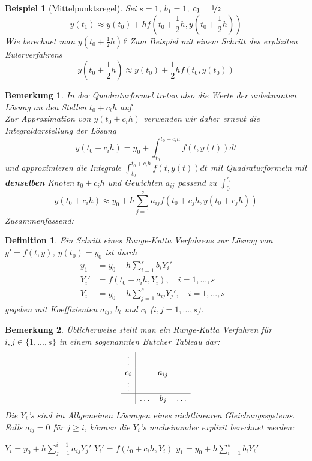 \documentclass[12pt]{article}
\theoremstyle{break}
\newtheorem{definition}[theorem]{Definition}
\newtheorem*{comment*}{Bemerkung}
\newtheorem{example}[theorem]{Beispiel}
\begin{document}
\begin{example}[Mittelpunktsregel]
Sei $s=1$, $b_1 = 1$, $c_1 = \nicefrac{1}{2}$
$$ y(t_1) \approx y(t_0) + hf(t_0 + \frac{1}{2}h, y(t_0 + \frac{1}{2}h))$$
Wie berechnet man $y(t_0 + \frac{1}{2}h)$?
Zum Beispiel mit einem Schritt des expliziten Eulerverfahrens
$$y(t_0 + \frac{1}{2}h) \approx y(t_0) + \frac{1}{2}hf(t_0, y(t_0))$$
\end{example}

\begin{comment*}
In der Quadraturformel treten also die Werte der unbekannten Lösung an den Stellen $t_0 + c_ih$ auf. \\
Zur Approximation von $y(t_0 + c_ih)$ verwenden wir daher erneut die Integraldarstellung der Lösung
$$y(t_0 + c_ih) = y_0 + \int_{t_0}^{t_0+c_ih} f(t, y(t))dt$$
und approximieren die Integrale $\int_{t_0}^{t_0 + c_ih}f(t, y(t))dt$ mit Quadraturformeln mit \textbf{denselben} Knoten $t_0 + c_ih$ und Gewichten $a_{ij}$ passend zu $\int_0^{c_i}$
$$y(t_0 +c_ih) \approx y_0 + h \sum_{j=1}^s a_{ij} f(t_0 + c_jh, y(t_0 + c_jh))$$
Zusammenfassend:
\end{comment*}

\begin{definition}
Ein Schritt eines Runge-Kutta Verfahrens zur Lösung von $y' = f(t, y)$, $y(t_0) = y_0$ ist durch
\begin{align*}
y_1 &= y_0 + h \sum_{i=1}^s b_i Y_i' &\\
Y_i' &= f(t_0 + c_ih, Y_i), \quad i = 1,...,s &\\
Y_i &= y_0 + h \sum_{j=1}^s a_{ij} Y_j', \quad i=1,...,s
\end{align*}
gegeben mit Koeffizienten $a_{ij}$, $b_i$ und $c_i$ ($i, j = 1,...,s$).
\end{definition}

\begin{comment*}
Üblicherweise stellt man ein Runge-Kutta Verfahren für $i, j \in \{1,...,s\}$ in einem sogenannten Butcher Tableau dar:
$$\begin{array}{c|ccc} \vdots && \\ c_i && a_{ij} & \\ \vdots & & \\ \hline & \hdots & b_j & \hdots \end{array} $$
Die $Y_i$'s sind im Allgemeinen Lösungen eines nichtlinearen Gleichungssystems.\\
Falls $a_{ij} = 0$ für $j \geq i$, können die $Y_i$'s nacheinander explizit berechnet werden:
\begin{algorithmic}
  \STATE $Y_i = y_0 + h \sum_{j=1}^{i-1} a_{ij}Y_j'$
  \STATE $Y_i' = f(t_0 + c_ih, Y_i)$
\ENDFOR
\STATE $y_1 = y_0 + h \sum_{i=1}^s b_i Y_i'$
\end{algorithmic}
\end{comment*}
\end{document}
